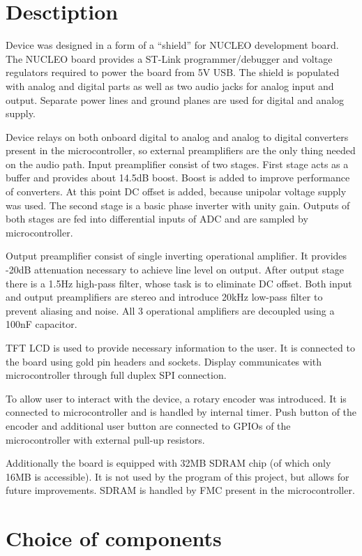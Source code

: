 \documentclass[a4paper,twoside,12pt]{book}
\begin{document}
\section{Desctiption}
Device was designed in a form of a “shield” for NUCLEO development board.
The NUCLEO board provides a ST-Link programmer/debugger
and voltage regulators required to power the board from 5V USB.
The shield is populated with analog and digital parts
as well as two audio jacks for analog input and output.
Separate power lines and ground planes are used for digital and analog supply.

Device relays on both onboard digital to analog
and analog to digital converters present in the microcontroller,
so external preamplifiers are the only thing needed on the audio path.
Input preamplifier consist of two stages.
First stage acts as a buffer and provides about 14.5dB boost.
Boost is added to improve performance of converters.
At this point DC offset is added, because unipolar voltage supply was used.
The second stage is a basic phase inverter with unity gain.
Outputs of both stages are fed into differential inputs of ADC
and are sampled by microcontroller.

Output preamplifier consist of single inverting operational amplifier.
It provides -20dB attenuation necessary to achieve line level on output.
After output stage there is a 1.5Hz high-pass filter,
whose task is to eliminate DC offset.
Both input and output preamplifiers are stereo and introduce 20kHz low-pass filter
to prevent aliasing and noise.
All 3 operational amplifiers are decoupled using a 100nF capacitor.

TFT LCD is used to provide necessary information to the user.
It is connected to the board using gold pin headers and sockets.
Display communicates with microcontroller through full duplex SPI connection.

To allow user to interact with the device, a rotary encoder was introduced.
It is connected to microcontroller and is handled by internal timer.
Push button of the encoder and additional user button are connected
to GPIOs of the microcontroller with external pull-up resistors.

Additionally the board is equipped with 32MB SDRAM chip
(of which only 16MB is accessible).
It is not used by the program of this project, but allows for future improvements.
SDRAM is handled by FMC present in the microcontroller.

\section{Choice of components}
\end{document}
